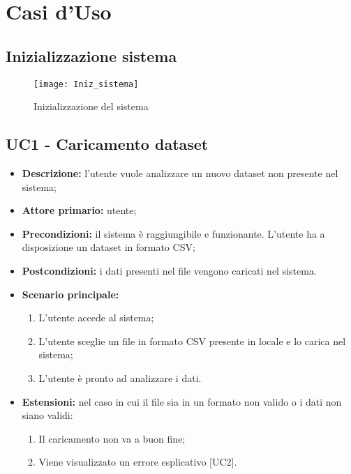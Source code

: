 \chapter{Casi d'Uso}
\section*{Inizializzazione sistema}

\begin{figure}[ht]
  \centering
  \texttt{[image: Iniz\_sistema]}
  \caption{Inizializzazione del sistema}
\end{figure}
\section{UC1 - Caricamento dataset}
\begin{itemize}
  \item \textbf{Descrizione:} l'utente vuole analizzare un nuovo dataset non presente nel sistema;
  \item \textbf{Attore primario:} utente;
  \item \textbf{Precondizioni:} il sistema è raggiungibile e funzionante. L’utente ha a disposizione un dataset in formato CSV;
  \item \textbf{Postcondizioni:} i dati presenti nel file vengono caricati nel sistema.
  \item \textbf{Scenario principale:}
  \begin{enumerate}
    \item L'utente accede al sistema;
    \item L'utente sceglie un file in formato CSV presente in locale e lo carica nel sistema;
    \item L'utente è pronto ad analizzare i dati.
  \end{enumerate}
  \item \textbf{Estensioni:} nel caso in cui il file sia in un formato non valido o i dati non siano validi:
    \begin{enumerate}
      \item Il caricamento non va a buon fine;
      \item Viene visualizzato un errore esplicativo [UC2].
    \end{enumerate}
\end{itemize}

